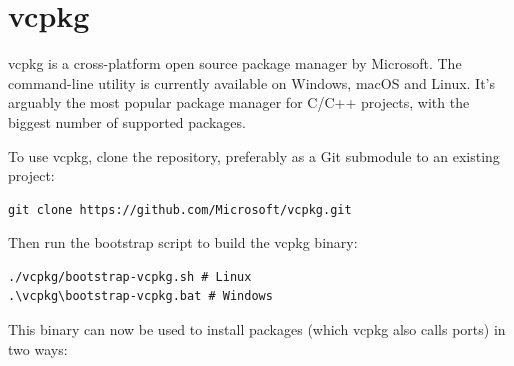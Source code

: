\documentclass[table, xcdraw]{article}%
\begin{document}
\section{vcpkg}

vcpkg is a cross-platform open source package manager by Microsoft. The command-line utility is currently available on Windows, macOS and Linux. It's arguably the most popular package manager for C/C++ projects, with the biggest number of supported packages.

To use vcpkg, clone the repository, preferably as a Git submodule to an existing project:

\begin{verbatim}
git clone https://github.com/Microsoft/vcpkg.git
\end{verbatim}

Then run the bootstrap script to build the vcpkg binary:

\begin{verbatim}
./vcpkg/bootstrap-vcpkg.sh # Linux
.\vcpkg\bootstrap-vcpkg.bat # Windows
\end{verbatim}

This binary can now be used to install packages (which vcpkg also calls ports) in two ways:
\end{document}
